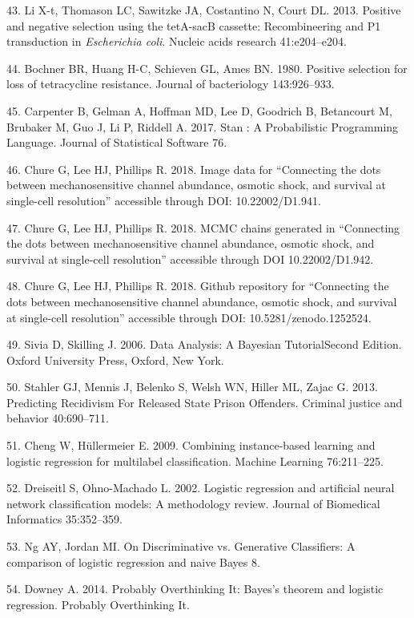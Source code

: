 \hypertarget{ref-li2013}{}
43. Li
X-t,
Thomason
LC,
Sawitzke
JA,
Costantino
N,
Court
DL.
2013.
Positive
and
negative
selection
using
the
tetA-sacB
cassette:
Recombineering
and P1
transduction
in
\emph{Escherichia
coli}.
Nucleic
acids
research
41:e204--e204.

\hypertarget{ref-bochner1980}{}
44.
Bochner
BR,
Huang
H-C,
Schieven
GL,
Ames
BN.
1980.
Positive
selection
for
loss
of
tetracycline
resistance.
Journal
of
bacteriology
143:926--933.

\hypertarget{ref-carpenter2017}{}
45.
Carpenter
B,
Gelman
A,
Hoffman
MD,
Lee D,
Goodrich
B,
Betancourt
M,
Brubaker
M, Guo
J, Li
P,
Riddell
A.
2017.
Stan :
A
Probabilistic
Programming
Language.
Journal
of
Statistical
Software
76.

\hypertarget{ref-chure2018a}{}
46.
Chure
G, Lee
HJ,
Phillips
R.
2018.
Image
data
for
``Connecting
the
dots
between
mechanosensitive
channel
abundance,
osmotic
shock,
and
survival
at
single-cell
resolution''
accessible
through
DOI:
10.22002/D1.941.

\hypertarget{ref-chure2018}{}
47.
Chure
G, Lee
HJ,
Phillips
R.
2018.
MCMC
chains
generated
in
``Connecting
the
dots
between
mechanosensitive
channel
abundance,
osmotic
shock,
and
survival
at
single-cell
resolution''
accessible
through
DOI
10.22002/D1.942.

\hypertarget{ref-chure2018b}{}
48.
Chure
G, Lee
HJ,
Phillips
R.
2018.
Github
repository
for
``Connecting
the
dots
between
mechanosensitive
channel
abundance,
osmotic
shock,
and
survival
at
single-cell
resolution''
accessible
through
DOI:
10.5281/zenodo.1252524.

\hypertarget{ref-sivia2006}{}
49.
Sivia
D,
Skilling
J.
2006.
Data
Analysis:
A
Bayesian
TutorialSecond
Edition.
Oxford
University
Press,
Oxford,
New
York.

\hypertarget{ref-stahler2013}{}
50.
Stahler
GJ,
Mennis
J,
Belenko
S,
Welsh
WN,
Hiller
ML,
Zajac
G.
2013.
Predicting
Recidivism
For
Released
State
Prison
Offenders.
Criminal
justice
and
behavior
40:690--711.

\hypertarget{ref-cheng2009}{}
51.
Cheng
W,
Hüllermeier
E.
2009.
Combining
instance-based
learning
and
logistic
regression
for
multilabel
classification.
Machine
Learning
76:211--225.

\hypertarget{ref-dreiseitl2002}{}
52.
Dreiseitl
S,
Ohno-Machado
L.
2002.
Logistic
regression
and
artificial
neural
network
classification
models:
A
methodology
review.
Journal
of
Biomedical
Informatics
35:352--359.

\hypertarget{ref-ng}{}
53. Ng
AY,
Jordan
MI. On
Discriminative
vs.
Generative
Classifiers:
A
comparison
of
logistic
regression
and
naive
Bayes
8.

\hypertarget{ref-downey2014}{}
54.
Downey
A.
2014.
Probably
Overthinking
It:
Bayes's
theorem
and
logistic
regression.
Probably
Overthinking
It.

